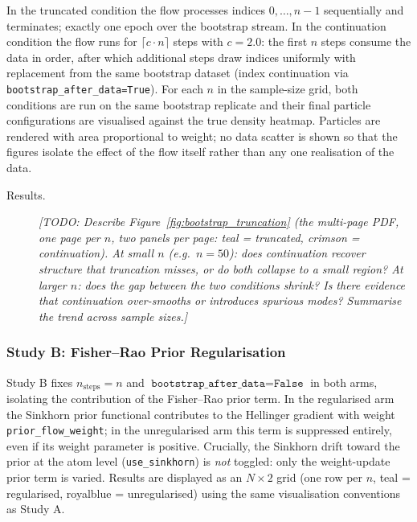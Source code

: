 In the truncated condition the flow processes indices $0, \ldots, n-1$ sequentially and
terminates; exactly one epoch over the bootstrap stream.
In the continuation condition the flow runs for $\lceil c \cdot n \rceil$ steps with
$c = 2.0$: the first $n$ steps consume the data in order, after which additional steps draw
indices uniformly with replacement from the same bootstrap dataset (index continuation via
\texttt{bootstrap\_after\_data=True}).
For each $n$ in the sample-size grid, both conditions are run on the same bootstrap replicate
and their final particle configurations are visualised against the true density heatmap.
Particles are rendered with area proportional to weight; no data scatter is shown so that the
figures isolate the effect of the flow itself rather than any one realisation of the data.

\begin{description}
  \item[Results.]
  \textit{[TODO: Describe Figure~\ref{fig:bootstrap_truncation} (the multi-page PDF,
  one page per $n$, two panels per page: teal = truncated, crimson = continuation).
  At small $n$ (e.g.\ $n = 50$): does continuation recover structure that truncation misses,
  or do both collapse to a small region?
  At larger $n$: does the gap between the two conditions shrink?
  Is there evidence that continuation over-smooths or introduces spurious modes?
  Summarise the trend across sample sizes.]}
\end{description}

\subsubsection{Study B: Fisher--Rao Prior Regularisation}
\label{subsubsec:studyB}

Study B fixes $n_{\text{steps}} = n$ and $\texttt{bootstrap\_after\_data} = \texttt{False}$
in both arms, isolating the contribution of the Fisher--Rao prior term.
In the regularised arm the Sinkhorn prior functional contributes to the Hellinger gradient
with weight \texttt{prior\_flow\_weight}; in the unregularised arm this term is suppressed
entirely, even if its weight parameter is positive.
Crucially, the Sinkhorn drift toward the prior at the atom level (\texttt{use\_sinkhorn}) is
\emph{not} toggled: only the weight-update prior term is varied.
Results are displayed as an $N \times 2$ grid (one row per $n$, teal = regularised,
royalblue = unregularised) using the same visualisation conventions as Study A.

